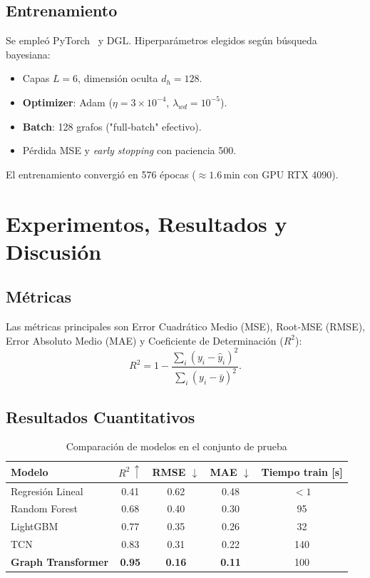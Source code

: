 \documentclass[conference]{IEEEtran}
\begin{document}
\subsection{Entrenamiento}
Se empleó PyTorch~\cite{paszke2019pytorch} y DGL. Hiperparámetros elegidos
según búsqueda bayesiana:
\begin{itemize}
  \item Capas $L=6$, dimensión oculta $d_h=128$.
  \item \textbf{Optimizer}: Adam ($\eta=3\times10^{-4}$, $\lambda_{wd}=10^{-5}$).
  \item \textbf{Batch}: 128 grafos ("full‐batch" efectivo).
  \item Pérdida MSE y \emph{early stopping} con paciencia 500.
\end{itemize}
El entrenamiento convergió en 576 épocas ($\approx1.6$\,min con GPU RTX 4090).

\section{Experimentos, Resultados y Discusión}
\subsection{Métricas}
Las métricas principales son Error Cuadrático Medio (MSE), Root‐MSE (RMSE),
Error Absoluto Medio (MAE) y Coeficiente de Determinación ($R^{2}$):
\begin{equation}
  R^{2}=1-\frac{\sum_{i}(y_i-\hat{y}_i)^2}{\sum_{i}(y_i-\bar{y})^2}.
\end{equation}

\subsection{Resultados Cuantitativos}
\begin{table}[!t]
  \centering
  \caption{Comparación de modelos en el conjunto de prueba}
  \label{tab:results}
  \begin{tabular}{lcccc}
    \toprule
    Modelo & $R^{2}\,\uparrow$ & RMSE $\downarrow$ & MAE $\downarrow$ & Tiempo train [s] \\
    \midrule
    Regresión Lineal & 0.41 & 0.62 & 0.48 & $<1$\\
    Random Forest & 0.68 & 0.40 & 0.30 & 95\\
    LightGBM & 0.77 & 0.35 & 0.26 & 32\\
    TCN & 0.83 & 0.31 & 0.22 & 140\\
    \textbf{Graph Transformer} & \textbf{0.95} & \textbf{0.16} & \textbf{0.11} & 100\\
    \bottomrule
  \end{tabular}
\end{table}
\end{document}

